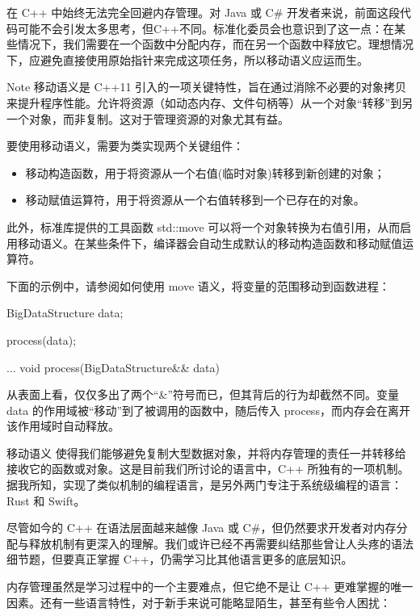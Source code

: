 在 C++ 中始终无法完全回避内存管理。对 Java 或 C\# 开发者来说，前面这段代码可能不会引发太多思考，但C++不同。标准化委员会也意识到了这一点：在某些情况下，我们需要在一个函数中分配内存，而在另一个函数中释放它。理想情况下，应避免直接使用原始指针来完成这项任务，所以移动语义应运而生。

\begin{myNotic}{Note}
移动语义是 C++11 引入的一项关键特性，旨在通过消除不必要的对象拷贝来提升程序性能。允许将资源（如动态内存、文件句柄等）从一个对象“转移”到另一个对象，而非复制。这对于管理资源的对象尤其有益。

要使用移动语义，需要为类实现两个关键组件：

\begin{itemize}
\item 
移动构造函数，用于将资源从一个右值(临时对象)转移到新创建的对象；

\item 
移动赋值运算符，用于将资源从一个右值转移到一个已存在的对象。
\end{itemize}

此外，标准库提供的工具函数 std::move 可以将一个对象转换为右值引用，从而启用移动语义。在某些条件下，编译器会自动生成默认的移动构造函数和移动赋值运算符。
\end{myNotic}

下面的示例中，请参阅如何使用 move 语义，将变量的范围移动到函数进程：

\begin{cpp}
BigDataStructure data{};

process(data);

...
void process(BigDataStructure&& data){
}
\end{cpp}

从表面上看，仅仅多出了两个“\&”符号而已，但其背后的行为却截然不同。变量 data 的作用域被“移动”到了被调用的函数中，随后传入 process，而内存会在离开该作用域时自动释放。

移动语义 使得我们能够避免复制大型数据对象，并将内存管理的责任一并转移给接收它的函数或对象。这是目前我们所讨论的语言中，C++ 所独有的一项机制。据我所知，实现了类似机制的编程语言，是另外两门专注于系统级编程的语言：Rust 和 Swift。

尽管如今的 C++ 在语法层面越来越像 Java 或 C\#，但仍然要求开发者对内存分配与释放机制有更深入的理解。我们或许已经不再需要纠结那些曾让人头疼的语法细节题，但要真正掌握 C++，仍需学习比其他语言更多的底层知识。

内存管理虽然是学习过程中的一个主要难点，但它绝不是让 C++ 更难掌握的唯一因素。还有一些语言特性，对于新手来说可能略显陌生，甚至有些令人困扰：

